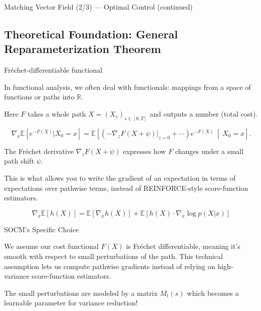 \documentclass[aspectratio=169,xcolor=dvipsnames]{beamer}
\begin{document}
\begin{frame}[allowframebreaks]{Matching Vector Field (2/3) — Optimal Control (continued)}
    
    \subsection*{Theoretical Foundation: General Reparameterization Theorem}
    
    \begin{block}{Fréchet-differentiable functional}
        
    
    In functional analysis, we often deal with functionals: mappings from a space of functions or paths into $\mathbb{R}$.

    Here $F$ takes a whole path $X = (X_s)_{s \in [0,T]}$ and outputs a number (total cost).

    $$\nabla_x \mathbb{E}[e^{-F(X)} | X_0 = x] = \mathbb{E}\left[\left(-\nabla_z F(X + \psi)\big|_{z=0} + \cdots\right) e^{-F(X)} \,\middle|\, X_0 = x\right].$$

    \end{block}

    The Fréchet derivative $\nabla_z F(X + \psi)$ expresses how $F$ changes under a small path shift $\psi$.

    This is what allows you to write the gradient of an expectation in terms of expectations over pathwise terms, instead of REINFORCE-style score-function estimators.

    $$\nabla_x \mathbb{E}[h(X)] = \mathbb{E}[\nabla_x h(X)] + \mathbb{E}[h(X) \cdot \nabla_x \log p(X|x)] $$
    
    \vspace{0.8cm}
    
    \begin{block}{SOCM's Specific Choice}

        We assume our cost functional $F(X)$ is Fréchet differentiable, meaning it's smooth with respect to small perturbations of the path. This technical assumption lets us compute pathwise gradients instead of relying on high-variance score-function estimators.

        \vspace{0.1cm}

        The small perturbations are modeled by a matrix $M_t(s)$ which becomes a learnable parameter for variance reduction!
    \end{block}


\end{frame}
\end{document}

